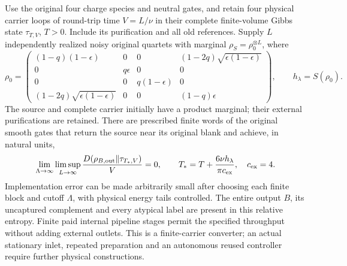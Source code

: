 \begin{proposition}
\label{prop:thermal-buffer-sort}
Use the original four charge species and neutral gates, and retain
four physical carrier loops of round-trip time $V=L/\nu$ in their
complete finite-volume Gibbs state $\tau_{T,V}$, $T>0$.
Include its purification and all old references. Supply $L$
independently realized noisy original quartets with marginal
$\rho_S=\rho_0^{\otimes L}$, where
\[
 \rho_0=\begin{pmatrix}
 (1-q)(1-\epsilon)&0&0&(1-2q)\sqrt{\epsilon(1-\epsilon)}\\
 0&q\epsilon&0&0\\0&0&q(1-\epsilon)&0\\
 (1-2q)\sqrt{\epsilon(1-\epsilon)}&0&0&(1-q)\epsilon
 \end{pmatrix},\qquad h_\lambda=S(\rho_0).
\]
The source and complete carrier initially have a product marginal;
their external purifications are retained. There are prescribed
finite words of the original smooth gates that return the source
near its original blank and achieve, in natural units,
\begin{equation}
 \lim_{\Lambda\to\infty}\limsup_{L\to\infty}
 \frac{D(\rho_{B,\rm out}\Vert\tau_{T_*,V})}{V}=0,
 \qquad T_*=T+\frac{6\nu h_\lambda}{\pi c_{\rm ex}},
 \quad c_{\rm ex}=4.
 \label{eq:finite-sort-deficit}
\end{equation}
Implementation error can be made arbitrarily small after choosing
each finite block and cutoff $\Lambda$, with physical energy tails
controlled. The entire output $B$, its uncaptured complement and
every atypical label are present in this relative entropy.
Finite paid internal pipeline stages permit the specified throughput
without adding external outlets. This is a finite-carrier converter;
an actual stationary inlet, repeated preparation and an autonomous
reused controller require further physical constructions.
\end{proposition}
